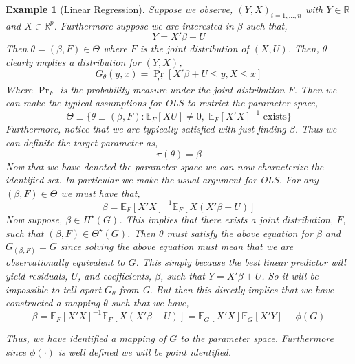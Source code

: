 \documentclass[final,pdftex]{ectaart}
\numberwithin{equation}{section}
\theoremstyle{plain}
\newtheorem{example}{Example}[section]
\newcommand{\E}[0]{\mathbb{E}}
\newcommand{\R}{\mathbb{R}}
\begin{document}
\begin{example}[Linear Regression]\label{ex:linreg}
Suppose we observe, $(Y,X)_{i=1,\dots,n}$ with $Y\in\R$ and $X\in\R^p$. Furthermore suppose we are interested in $\beta$ such that,
$$Y = X'\beta + U$$
Then $\theta = (\beta, F) \in \Theta$ where $F$ is the joint distribution of $(X,U)$. Then, $\theta$ clearly implies a distribution for $(Y,X)$,
$$G_\theta(y,x) = \text{$\Pr$}_{F}[X'\beta + U \leq y, X\leq x]$$
Where $\Pr_F$ is the probability measure under the joint distribution $F$. Then we can make the typical assumptions for OLS to restrict the parameter space,
$$\Theta \equiv \{\theta\equiv(\beta,F):\E_F[XU]\neq 0, \;\E_F[X'X]^{-1} \text{ exists}\}$$
Furthermore, notice that we are typically satisfied with just finding $\beta$. Thus we can definite the target parameter as,
$$\pi(\theta) = \beta$$
Now that we have denoted the parameter space we can now characterize the identified set. In particular we make the usual argument for OLS. For any $(\beta, F)\in\Theta$ we must have that,
$$\beta = \E_F[X'X]^{-1}\E_F[X(X'\beta + U)]$$
Now suppose, $\beta \in \Pi^\star(G)$. This implies that there exists a joint distribution, $F$, such that $(\beta, F)\in\Theta^\star(G)$. Then $\theta$ must satisfy the above equation for $\beta$ and $G_{(\beta,F)}=G$ since solving the above equation must mean that we are observationally equivalent to $G$. This simply because the best linear predictor will yield residuals, $U$, and coefficients, $\beta$, such that $Y=X'\beta + U$. So it will be impossible to tell apart $G_{\theta}$ from G. But then this directly implies that we have constructed a mapping $\theta$ such that we have,
 $$\beta = \E_F[X'X]^{-1}\E_F[X(X'\beta + U)] = \E_G[X'X]\E_G[X'Y]\equiv \phi(G)$$

 Thus, we have identified a mapping of $G$ to the parameter space. Furthermore since $\phi(\cdot)$ is well defined we will be point identified.

\end{example}
\end{document}
